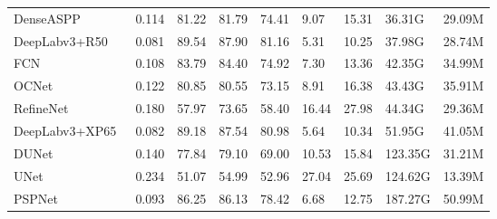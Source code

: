 \documentclass[runningheads]{llncs}
\begin{document}
{\begin{table}[ht]
\begin{minipage}[ht]{0cm}
{{\begin{tabular}{p{100pt}<{\centering}|p{37pt}<{\centering}|p{37pt}<{\centering}|p{37pt}<{\centering}p{37pt}<{\centering}|p{37pt}<{\centering}p{37pt}<{\centering}|p{37pt}<{\centering}p{37pt}<{\centering}}
\hline
\rule{0pt}{10pt} DenseASPP~\cite{denseaspp} & 0.114 & 81.22 & 81.79 & 74.41 & 9.07 & 15.31 & 36.31G & 29.09M \\
\rule{0pt}{10pt} DeepLabv3+R50~\cite{deeplabv3+} & 0.081 & 89.54 & 87.90 & 81.16 & 5.31 & 10.25 & 37.98G & 28.74M  \\
\rule{0pt}{10pt} FCN~\cite{fcn} & 0.108 & 83.79 & 84.40 & 74.92 & 7.30 & 13.36 & 42.35G & 34.99M  \\
\rule{0pt}{10pt} OCNet~\cite{ocnet} & 0.122 & 80.85 & 80.55 & 73.15 & 8.91 & 16.38 & 43.43G & 35.91M  \\
\rule{0pt}{10pt} RefineNet~\cite{refinenet} & 0.180 & 57.97 & 73.65 & 58.40 & 16.44 & 27.98 & 44.34G & 29.36M  \\
\rule{0pt}{10pt} DeepLabv3+XP65~\cite{deeplabv3+} & 0.082 & 89.18 & 87.54 & 80.98 & 5.64 & 10.34 & 51.95G & 41.05M  \\
\rule{0pt}{10pt} DUNet~\cite{dunet} & 0.140 & 77.84 & 79.10 & 69.00 & 10.53 & 15.84 & 123.35G & 31.21M  \\
\rule{0pt}{10pt} UNet~\cite{unet} & 0.234 & 51.07 & 54.99 & 52.96 & 27.04 & 25.69 & 124.62G & 13.39M  \\
\rule{0pt}{10pt} PSPNet~\cite{pspnet} & 0.093 & 86.25 & 86.13 & 78.42 & 6.68 & 12.75 & 187.27G & 50.99M  \\


\end{tabular}}}
\end{minipage}
\end{table}}
\end{document}
